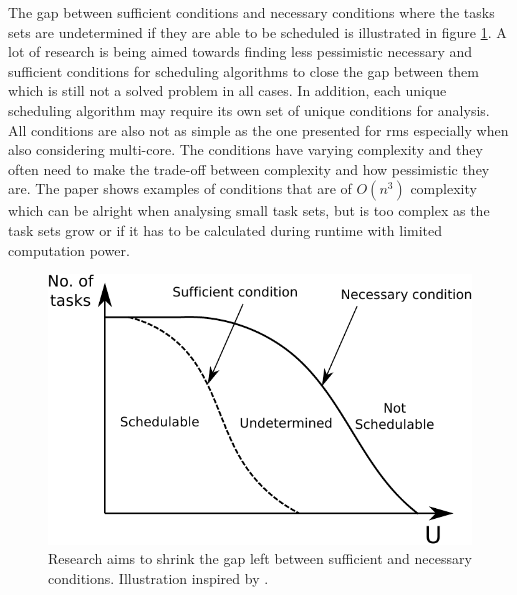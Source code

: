 \documentclass{kththesis}
\begin{document}
The gap between sufficient conditions and necessary conditions where the tasks sets are undetermined
if they are able to be scheduled is illustrated in figure
\ref{fig:sufficient_necessary_schedulability}. A lot of research is being aimed towards finding less
pessimistic necessary and sufficient conditions for scheduling algorithms to close the gap between
them which is still not a solved problem in all cases. In addition, each unique scheduling algorithm
may require its own set of unique conditions for analysis. All conditions are also not as simple as
the one presented for \acrshort{rms} especially when also considering multi-core. The conditions
have varying complexity and they often need to make the trade-off between complexity and how
pessimistic they are. The paper \parencite{bertogna_tests_2011} shows examples of conditions that
are of $ O(n^3) $ complexity which can be alright when analysing small task sets, but is too complex
as the task sets grow or if it has to be calculated during runtime with limited computation power.

\begin{figure}

    \centering

    \includegraphics[width=0.8\linewidth]{images/sufficient_necessary_schedulability.pdf}

    \caption{Research aims to shrink the gap left between sufficient and necessary conditions.
    Illustration inspired by \parencite{sebestyen_simulation-based_2012}.}

    \label{fig:sufficient_necessary_schedulability}

\end{figure}
\end{document}
